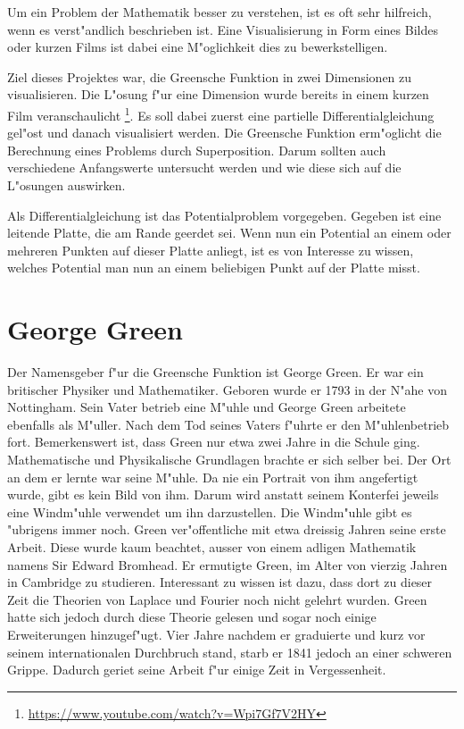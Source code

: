 \begin{refsection}
Um ein Problem der Mathematik besser zu verstehen, ist es oft sehr
hilfreich, wenn es verst"andlich beschrieben ist. Eine Visualisierung
in Form eines Bildes oder kurzen Films ist dabei eine M"oglichkeit
dies zu bewerkstelligen.
	
Ziel dieses Projektes war, die Greensche Funktion in zwei Dimensionen
zu visualisieren. Die L"osung f"ur eine Dimension wurde bereits in
einem kurzen Film veranschaulicht
\footnote{\url{https://www.youtube.com/watch?v=Wpi7Gf7V2HY}}. Es
soll dabei zuerst eine partielle Differentialgleichung gel"ost und
danach visualisiert werden. Die Greensche Funktion erm"oglicht die
Berechnung eines Problems durch Superposition. Darum sollten auch
verschiedene Anfangswerte untersucht werden und wie diese sich auf
die L"osungen auswirken.
	
Als Differentialgleichung ist das Potentialproblem vorgegeben.
Gegeben ist eine leitende Platte, die am Rande geerdet sei. Wenn
nun ein Potential an einem oder mehreren Punkten auf dieser Platte
anliegt, ist es von Interesse zu wissen, welches Potential man nun
an einem beliebigen Punkt auf der Platte misst.

\section{George Green}

Der Namensgeber f"ur die Greensche Funktion ist George Green. Er
war ein britischer Physiker und Mathematiker. Geboren wurde er 1793
in der N"ahe von Nottingham. Sein Vater betrieb eine M"uhle und
George Green arbeitete ebenfalls als M"uller. Nach dem Tod seines
Vaters f"uhrte er den M"uhlenbetrieb fort. Bemerkenswert ist, dass
Green nur etwa zwei Jahre in die Schule ging. Mathematische und
Physikalische Grundlagen brachte er sich selber bei. Der Ort an dem
er lernte war seine M"uhle. Da nie ein Portrait von ihm angefertigt
wurde, gibt es kein Bild von ihm. Darum wird anstatt seinem Konterfei
jeweils eine Windm"uhle verwendet um ihn darzustellen. Die Windm"uhle
gibt es "ubrigens immer noch. Green ver"offentliche mit etwa dreissig
Jahren seine erste Arbeit. Diese wurde kaum beachtet, ausser von
einem adligen Mathematik namens Sir Edward Bromhead. Er ermutigte
Green, im Alter von vierzig Jahren in Cambridge zu studieren.
Interessant zu wissen ist dazu, dass dort zu dieser Zeit die Theorien
von Laplace und Fourier noch nicht gelehrt wurden. Green hatte sich
jedoch durch diese Theorie gelesen und sogar noch einige Erweiterungen
hinzugef"ugt. Vier Jahre nachdem er graduierte und kurz vor seinem
internationalen Durchbruch stand, starb er 1841 jedoch an einer
schweren Grippe. Dadurch geriet seine Arbeit f"ur einige Zeit in
Vergessenheit.
	

\end{refsection}
